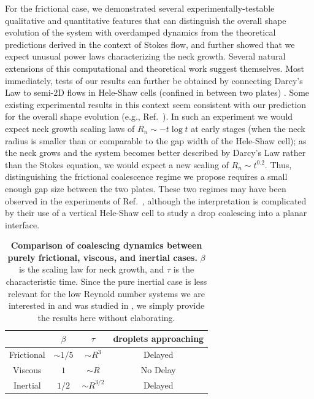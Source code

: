 \documentclass[%
reprint,
amsmath,amssymb,
aps,
]{revtex4-2}
\begin{document}
 For the frictional case, we demonstrated several experimentally-testable qualitative and quantitative features that can distinguish the overall shape evolution of the system with overdamped dynamics from the theoretical predictions derived in the context of Stokes flow, and further showed that we expect unusual power laws characterizing the neck growth. Several natural extensions of this computational and theoretical work suggest themselves. Most immediately, tests of our results can further be obtained by connecting Darcy's Law to semi-2D flows in Hele-Shaw cells (confined in between two plates) \cite{mclean_saffman_1981}. Some existing experimental results in this context seem consistent with our prediction for the overall shape evolution (e.g., Ref.~\cite{brun2013generic}). In such an experiment we would expect neck growth scaling laws of $R_n\sim -t\log t$ at early stages (when the neck radius is smaller than or comparable to the gap width of the Hele-Shaw cell); as the neck grows and the system becomes better described by Darcy's Law rather than the Stokes equation, we would expect a new scaling of $R_n\sim t^{0.2}$. Thus, distinguishing the frictional coalescence regime we propose requires a small enough gap size between the two plates. These two regimes may have been observed in the experiments of Ref.~\cite{yokota_dimensional_2011}, although the interpretation is complicated by their use of a vertical Hele-Shaw cell to study a drop coalescing into a planar interface. 
\begin{table}
     \centering
     \begin{tabular}{c|c|c|c}
          & $\beta$ & $\tau$ & droplets approaching\\
         \hline
          Frictional &  $\sim1/5$ & $\sim R^3$ & Delayed\\
          Viscous &  $1$ & $\sim R$ & No Delay\\
          Inertial & $1/2$ & $\sim R^{3/2}$ \cite{heinenDropletCoalescenceMolecular2022a} & Delayed \\
     \end{tabular}
     \caption{\textbf{Comparison of coalescing dynamics between purely frictional, viscous, and inertial cases.} $\beta$ is the scaling law for neck growth, and $\tau$ is the characteristic time. Since the pure inertial case is less relevant for the low Reynold number systems we are interested in and was studied in \cite{heinenDropletCoalescenceMolecular2022a}, we simply provide the results here without elaborating. }
     \label{tab:summary}
 \end{table} 	
\end{document}
